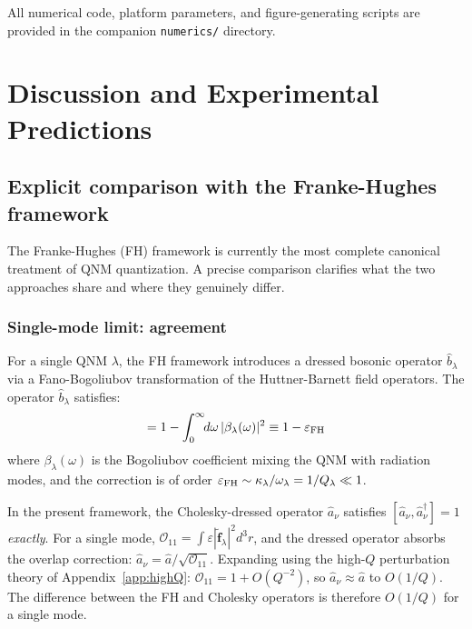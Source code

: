 \documentclass[12pt]{article}
\newcommand{\tf}{\tilde{\mathbf{f}}}
\begin{document}
All numerical code, platform parameters, and figure-generating
scripts are provided in the companion \texttt{numerics/} directory.

\section{Discussion and Experimental Predictions}
\label{sec:discussion}

\subsection{Explicit comparison with the Franke-Hughes framework}
\label{sec:franke_comparison}

The Franke-Hughes (FH) framework \cite{Franke2019,Ren2021,Franke2020}
is currently the most complete canonical treatment of QNM quantization.
A precise comparison clarifies what the two approaches share and where
they genuinely differ.

\subsubsection*{Single-mode limit: agreement}

For a single QNM $\lambda$, the FH framework introduces a dressed
bosonic operator $\hat{b}_\lambda$ via a Fano-Bogoliubov transformation of
the Huttner-Barnett field operators.  The operator $\hat{b}_\lambda$ satisfies:
\begin{equation}
  [\hat{b}_\lambda,\hat{b}_\lambda^\dagger]
  = 1 - \int_0^\infty\!\!d\omega\,|\beta_\lambda(\omega)|^2
  \equiv 1 - \varepsilon_{\rm FH}
  \label{eq:FH_comm}
\end{equation}
where $\beta_\lambda(\omega)$ is the Bogoliubov coefficient mixing the QNM
with radiation modes, and the correction is of order
$\varepsilon_{\rm FH}\sim\kappa_\lambda/\omega_\lambda=1/Q_\lambda\ll 1$.

In the present framework, the Cholesky-dressed operator $\hat{a}_\nu$
satisfies $[\hat{a}_\nu,\hat{a}_\nu^\dagger]=1$ \emph{exactly}.
For a single mode, $\mathcal{O}_{11}=\int\varepsilon|\tf_\lambda|^2d^3r$,
and the dressed operator absorbs the overlap correction:
$\hat{a}_\nu = \hat{a}/\sqrt{\mathcal{O}_{11}}$.  Expanding using the
high-$Q$ perturbation theory of Appendix~\ref{app:highQ}:
$\mathcal{O}_{11}=1+O(Q^{-2})$, so $\hat{a}_\nu\approx\hat{a}$ to
$O(1/Q)$.  The difference between the FH and Cholesky operators is
therefore $O(1/Q)$ for a single mode.
\end{document}
